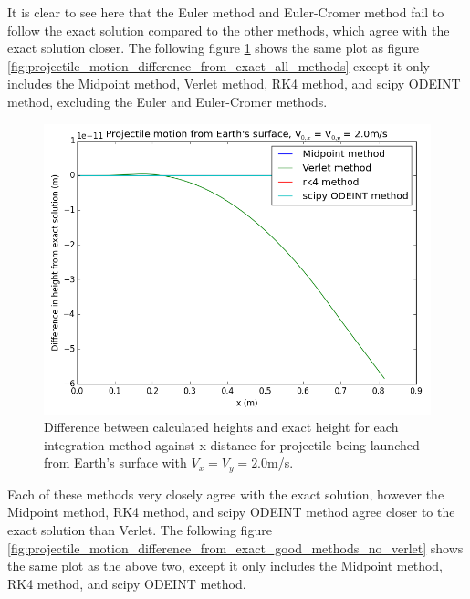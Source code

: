 \documentclass[10pt,letterpaper]{article}
\begin{document}
It is clear to see here that the Euler method and Euler-Cromer method fail to follow the exact solution compared to the other methods, which agree with the exact solution closer. The following figure \ref{fig:projectile_motion_difference_from_exact_good_methods} shows the same plot as figure \ref{fig:projectile_motion_difference_from_exact_all_methods} except it only includes the Midpoint method, Verlet method, RK4 method, and scipy ODEINT method, excluding the Euler and Euler-Cromer methods.\\

\begin{figure}[!htb]
\centering
\includegraphics[scale=0.6]{figures/test_cases/projectile_motion_difference_from_exact_good_methods.png}
\caption{Difference between calculated heights and exact height for each integration method against x distance for projectile being launched from Earth's surface with $V_x = V_y = 2.0$m/s.}\label{fig:projectile_motion_difference_from_exact_good_methods}
\end{figure}

Each of these methods very closely agree with the exact solution, however the Midpoint method, RK4 method, and scipy ODEINT method agree closer to the exact solution than Verlet. The following figure \ref{fig:projectile_motion_difference_from_exact_good_methods_no_verlet} shows the same plot as the above two, except it only includes the Midpoint method, RK4 method, and scipy ODEINT method.\\
\end{document}

